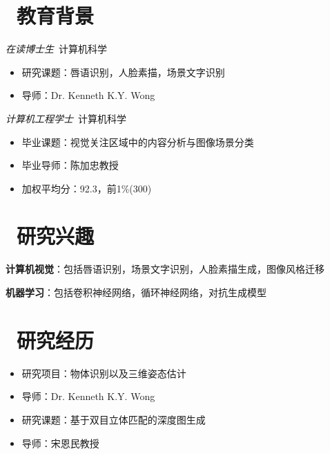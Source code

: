 \documentclass{resume}
\begin{document}


 
\section{\faGraduationCap\  教育背景}
\textit{在读博士生}\ 计算机科学
\begin{itemize}
  \item 研究课题：唇语识别，人脸素描，场景文字识别
  \item 导师：Dr. Kenneth K.Y. Wong
\end{itemize}
\textit{计算机工程学士}\ 计算机科学
\begin{itemize}
  \item 毕业课题：视觉关注区域中的内容分析与图像场景分类
  \item 毕业导师：陈加忠教授
  \item 加权平均分：92.3，前1\%(300)
\end{itemize}

\section{\faHeart \ 研究兴趣}
\textbf{计算机视觉}：包括唇语识别，场景文字识别，人脸素描生成，图像风格迁移

\textbf{机器学习}：包括卷积神经网络，循环神经网络，对抗生成模型

\section{\faUsers\ 研究经历}
\begin{itemize}
  \item 研究项目：物体识别以及三维姿态估计
  \item 导师：Dr. Kenneth K.Y. Wong
\end{itemize}

\begin{itemize}
  \item 研究课题：基于双目立体匹配的深度图生成
  \item 导师：宋恩民教授
\end{itemize}
\end{document}
